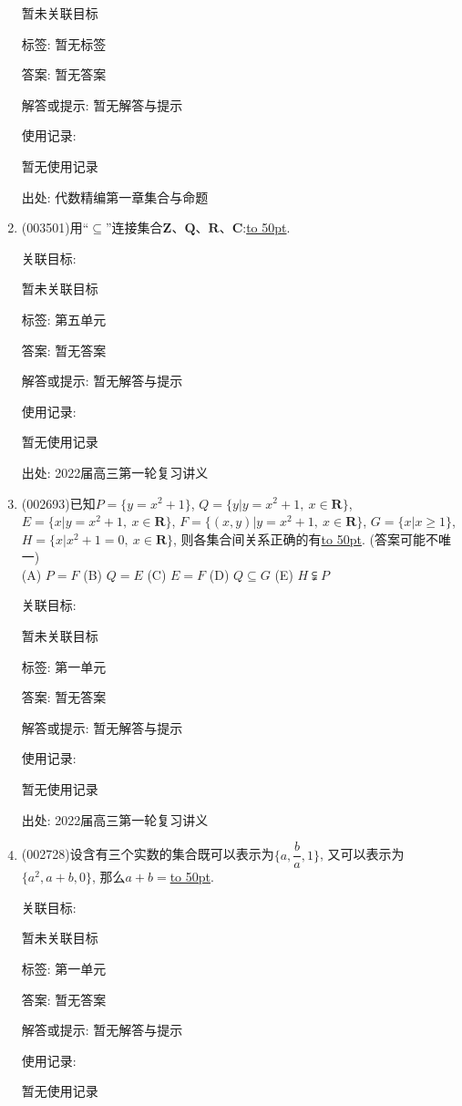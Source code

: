 \documentclass[10pt,a4paper]{article}
\newcommand{\blank}[1]{\underline{\hbox to #1pt{}}}
\begin{document}
\begin{enumerate}[1.]
暂未关联目标



标签: 暂无标签

答案: 暂无答案

解答或提示: 暂无解答与提示

使用记录:

暂无使用记录


出处: 代数精编第一章集合与命题
\item { (003501)}用``$\subseteq$''连接集合$\mathbf{Z}$、$\mathbf{Q}$、$\mathbf{R}$、$\mathbf{C}$:\blank{50}.


关联目标:

暂未关联目标



标签: 第五单元

答案: 暂无答案

解答或提示: 暂无解答与提示

使用记录:

暂无使用记录


出处: 2022届高三第一轮复习讲义
\item { (002693)}已知$P=\{y=x^2+1\}$, $Q=\{y|y=x^2+1, \ x\in \mathbf{R}\}$, $E=\{x|y=x^2+1, \  x\in \mathbf{R}\}$, $F=\{(x,y)|y=x^2+1, \ x\in \mathbf{R}\}$, $G=\{x|x\ge 1\}$, $H=\{x|x^2+1=0, \ x\in \mathbf{R}\}$, 则各集合间关系正确的有\blank{50}. (答案可能不唯一)\\
(A) $P=F$   (B) $Q=E$   (C) $E=F$   (D) $Q\subseteq G$  (E) $H\subsetneqq P$


关联目标:

暂未关联目标



标签: 第一单元

答案: 暂无答案

解答或提示: 暂无解答与提示

使用记录:

暂无使用记录


出处: 2022届高三第一轮复习讲义
\item { (002728)}设含有三个实数的集合既可以表示为$\{a,\dfrac ba,1\}$, 又可以表示为$\{a^2,a+b,0\}$, 那么$a+b=$\blank{50}.


关联目标:

暂未关联目标



标签: 第一单元

答案: 暂无答案

解答或提示: 暂无解答与提示

使用记录:

暂无使用记录



\end{enumerate}
\end{document}
